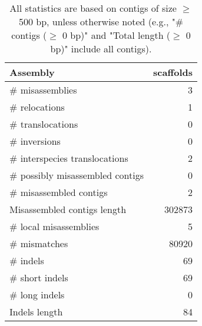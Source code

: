 \documentclass[12pt,a4paper]{article}
\begin{document}
\begin{table}[ht]
\begin{center}
\caption{All statistics are based on contigs of size $\geq$ 500 bp, unless otherwise noted (e.g., "\# contigs ($\geq$ 0 bp)" and "Total length ($\geq$ 0 bp)" include all contigs).}
\begin{tabular}{|l*{1}{|r}|}
\hline
Assembly & scaffolds \\ \hline
\# misassemblies & 3 \\ \hline
\hspace{5mm}\# relocations & 1 \\ \hline
\hspace{5mm}\# translocations & 0 \\ \hline
\hspace{5mm}\# inversions & 0 \\ \hline
\hspace{5mm}\# interspecies translocations & 2 \\ \hline
\# possibly misassembled contigs & 0 \\ \hline
\# misassembled contigs & 2 \\ \hline
Misassembled contigs length & 302873 \\ \hline
\# local misassemblies & 5 \\ \hline
\# mismatches & 80920 \\ \hline
\# indels & 69 \\ \hline
\hspace{5mm}\# short indels & 69 \\ \hline
\hspace{5mm}\# long indels & 0 \\ \hline
Indels length & 84 \\ \hline
\end{tabular}
\end{center}
\end{table}
\end{document}
